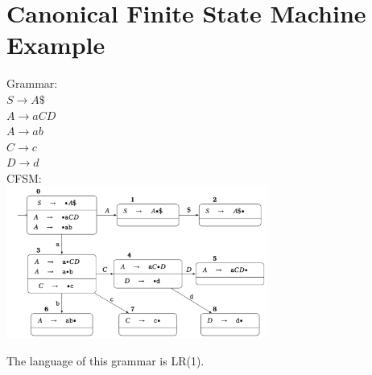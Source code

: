 
\section{Canonical Finite State Machine Example}
Grammar:\\
$S \rightarrow A\$$\\
$A \rightarrow aCD$\\
$A \rightarrow ab$\\
$C \rightarrow c$\\
$D \rightarrow d$\\

CFSM:\\
\includegraphics[height=5cm]{./images/Pasted image 20250317175419.png}

The language of this grammar is LR(1).
